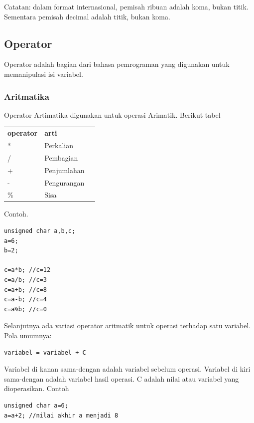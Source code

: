 \documentclass[12pt,]{article}
\begin{document}
	Catatan: dalam format internasional, pemisah ribuan adalah koma, bukan titik.
	Sementara pemisah decimal adalah titik, bukan koma.

	\newpage
	\subsection{Operator}
	Operator adalah bagian dari bahasa pemrograman yang digunakan untuk memanipulasi isi variabel.

	\subsubsection{Aritmatika}
	Operator Artimatika digunakan untuk operasi Arimatik.
	Berikut tabel

	\begin{table}[H]
		\begin{tabular}{|l|l|l}
			\cline{1-2}
			\textbf{operator} & \textbf{arti} \\ \cline{1-2}
			* & Perkalian \\ \cline{1-2}
			/ & Pembagian \\ \cline{1-2}
			+ & Penjumlahan \\ \cline{1-2}
			- & Pengurangan \\ \cline{1-2}
			\% & Sisa \\ \cline{1-2}
		\end{tabular}
	\end{table}

	Contoh.
	\begin{verbatim}
unsigned char a,b,c;
a=6;
b=2;

c=a*b; //c=12
c=a/b; //c=3
c=a+b; //c=8
c=a-b; //c=4
c=a%b; //c=0
	\end{verbatim}

	Selanjutnya ada variasi operator aritmatik untuk operasi terhadap satu variabel.
	Pola umumnya:
	\begin{verbatim}
variabel = variabel + C
	\end{verbatim}

	Variabel di kanan sama-dengan adalah variabel sebelum operasi.
	Variabel di kiri sama-dengan adalah variabel hasil operasi.
	C adalah nilai atau variabel yang dioperasikan.
	Contoh
	\begin{verbatim}
unsigned char a=6;
a=a+2; //nilai akhir a menjadi 8
	\end{verbatim}
\end{document}
